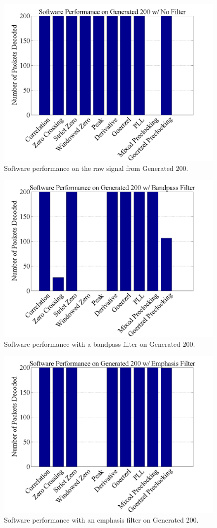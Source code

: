 \begin{figure}
  \centering
	\includegraphics[width=0.75\linewidth]{images/SoftwarePerformanceonGenerated200wNoFilter.png} 
	\caption{Software performance on the raw signal from Generated 200.}
   \label{Gen200FiltNo}
\end{figure}
\begin{figure}
  \centering
	\includegraphics[width=0.75\linewidth]{images/SoftwarePerformanceonGenerated200wBandpassFilter.png} 
	\caption{Software performance with a bandpass filter on Generated 200.}
   \label{Gen200Filt0}
\end{figure}
\begin{figure}
  \centering
	\includegraphics[width=0.75\linewidth]{images/SoftwarePerformanceonGenerated200wEmphasisFilter.png} 
	\caption{Software performance with an emphasis filter on Generated 200.}
   \label{Gen200Filt6}
\end{figure}

